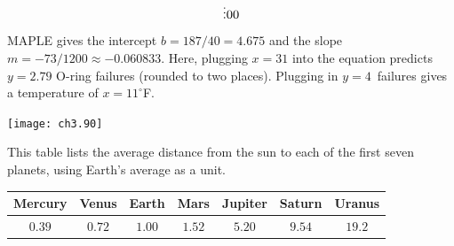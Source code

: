\begin{exercises}
\begin{answer}
\begin{exparts}
\begin{equation*}
{%
                     \vdots \\
                     0 \\
                     0}
          \end{equation*}
          MAPLE gives the intercept $b=187/40=4.675$ and the 
          slope $m=-73/1200\approx -0.060833$.
          Here, plugging $x=31$ into the equation predicts 
          $y=2.79$ O-ring failures (rounded to two places).
          Plugging in $y=4$~failures gives a temperature of 
          $x=11^\circ$F.
     \begin{center}  \small
       \texttt{[image: ch3.90]}
      \end{center}
      \end{exparts}  
    \end{answer}
  \item 
     This table lists the average distance from the sun to
     each of the first seven planets, using Earth's average as a unit.
     \begin{center}
       \begin{tabular}{ccccccc}
         Mercury &Venus   &Earth   &Mars    &Jupiter &Saturn  &Uranus  \\ 
         \hline     
         $0.39$  &$0.72$  &$1.00$  &$1.52$  &$5.20$  &$9.54$  &$19.2$
       \end{tabular}

\end{center}
\end{exercises}
